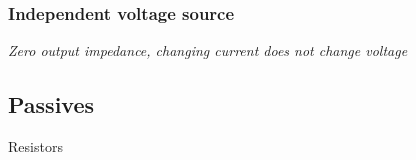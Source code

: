 \begin{Shaded}
\begin{Highlighting}[]
\OperatorTok{\textless{}}\OperatorTok{\textgreater{}} \OperatorTok{\textless{}}\OperatorTok{\textgreater{}} \OperatorTok{\textless{}}\OperatorTok{\textgreater{}}\OperatorTok{\textless{}}\OperatorTok{\textgreater{}}\OperatorTok{\textless{}}\OperatorTok{\textgreater{}}

\end{Highlighting}
\end{Shaded}

\subsubsection{Independent voltage
source}\label{independent-voltage-source}

\emph{Zero output impedance, changing current does not change voltage}

\begin{Shaded}
\begin{Highlighting}[]
\OperatorTok{\textless{}}\OperatorTok{\textgreater{}} \OperatorTok{\textless{}}\NormalTok{+}\OperatorTok{\textgreater{}} \OperatorTok{\textless{}}\NormalTok{{-}}\OperatorTok{\textgreater{}}\OperatorTok{\textless{}}\OperatorTok{\textgreater{}}\OperatorTok{\textless{}}\OperatorTok{\textgreater{}}

\end{Highlighting}
\end{Shaded}

\subsection{Passives}\label{passives}

Resistors

\begin{Shaded}
\begin{Highlighting}[]
\OperatorTok{\textless{}}\OperatorTok{\textgreater{}} \OperatorTok{\textless{}}\OperatorTok{\textgreater{}} \OperatorTok{\textless{}}\OperatorTok{\textgreater{}} \OperatorTok{\textless{}}\OperatorTok{\textgreater{}}

\end{Highlighting}
\end{Shaded}

